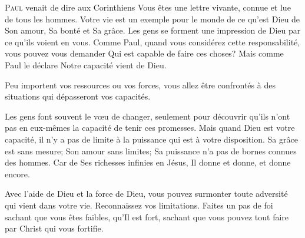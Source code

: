 



\lettrine{P}{aul} venait de dire aux Corinthiens\frcolon{} 
 \Og Vous êtes une lettre vivante, connue et lue de tous les hommes. \Fg{}
 Votre vie est un exemple pour le monde de ce qu'est Dieu \ocadr de Son amour,
 Sa bonté et Sa grâce.
 Les gens se forment une impression de Dieu par ce qu'ils voient en vous.
 Comme Paul, quand vous considérez cette responsabilité, 
 vous pouvez vous demander\frcolon{} 
 \Og Qui est capable de faire ces choses? \Fg{}
 Mais  comme Paul le déclare\frcolon{} 
 \Og Notre capacité vient de Dieu. \Fg{}

Peu importent vos ressources ou vos forces,
 vous allez être confrontés à des situations qui dépasseront vos capacités.


Les gens font souvent le v\oe{}u de changer, seulement pour découvrir
 qu'ils n'ont pas en eux-mêmes la capacité de tenir ces promesses.
 Mais quand Dieu est votre capacité, il n'y a pas de limite à la puissance
 qui est à votre disposition.
 Sa grâce est sans mesure; Son amour sans limites;
 Sa puissance n'a pas de bornes connues des hommes.
 Car de Ses richesses infinies en Jésus, Il donne et donne, et donne encore.

Avec l'aide de Dieu et la force de Dieu, vous pouvez surmonter
 toute adversité qui vient dans votre vie. Reconnaissez vos limitations.
 Faites un pas de foi sachant que vous êtes faibles, qu'Il est fort,
 sachant que vous pouvez tout faire par Christ qui vous fortifie.

\dvrule



